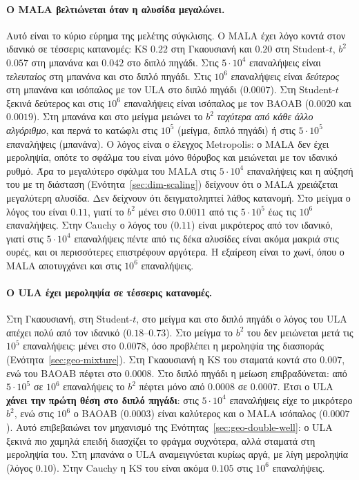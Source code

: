 \paragraph{Ο MALA βελτιώνεται όταν η αλυσίδα μεγαλώνει.}
Αυτό είναι το κύριο εύρημα της μελέτης σύγκλισης. Ο MALA έχει λόγο κοντά στον ιδανικό σε
τέσσερις κατανομές: KS $0.22$ στη Γκαουσιανή και $0.20$ στη Student-$t$, $b^2$ $0.057$
στη μπανάνα και $0.042$ στο διπλό πηγάδι. Στις $5 \cdot 10^4$ επαναλήψεις είναι
\emph{τελευταίος} στη μπανάνα και στο διπλό πηγάδι. Στις $10^6$ επαναλήψεις είναι
\emph{δεύτερος} στη μπανάνα και ισόπαλος με τον ULA στο διπλό πηγάδι ($0.0007$). Στη
Student-$t$ ξεκινά δεύτερος και στις $10^6$ επαναλήψεις είναι ισόπαλος με τον BAOAB
($0.0020$ και $0.0019$). Στη μπανάνα και στο μείγμα μειώνει το $b^2$ \emph{ταχύτερα από
κάθε άλλο αλγόριθμο}, και περνά το κατώφλι στις $10^5$ (μείγμα, διπλό πηγάδι) ή στις
$5 \cdot 10^5$ επαναλήψεις (μπανάνα). Ο λόγος είναι ο έλεγχος Metropolis: ο MALA δεν
έχει μεροληψία, οπότε το σφάλμα του είναι μόνο θόρυβος και μειώνεται με τον ιδανικό
ρυθμό. Άρα το μεγαλύτερο σφάλμα του MALA στις $5 \cdot 10^4$ επαναλήψεις και η αύξησή
του με τη διάσταση (Ενότητα~\ref{sec:dim-scaling}) δείχνουν ότι ο MALA χρειάζεται
μεγαλύτερη αλυσίδα. Δεν δείχνουν ότι δειγματοληπτεί λάθος κατανομή. Στο μείγμα ο λόγος του
είναι $0.11$, γιατί το $b^2$ μένει στο $0.0011$ από τις $5 \cdot 10^5$ έως τις $10^6$
επαναλήψεις. Στην Cauchy ο λόγος του ($0.11$) είναι μικρότερος από τον ιδανικό, γιατί
στις $5 \cdot 10^4$ επαναλήψεις πέντε από τις δέκα αλυσίδες είναι ακόμα μακριά στις
ουρές, και οι περισσότερες επιστρέφουν αργότερα. Η εξαίρεση είναι το χωνί, όπου ο MALA αποτυγχάνει και
στις $10^6$ επαναλήψεις.

\paragraph{Ο ULA έχει μεροληψία σε τέσσερις κατανομές.}
Στη Γκαουσιανή, στη Student-$t$, στο μείγμα και στο διπλό πηγάδι ο λόγος του ULA
απέχει πολύ από τον ιδανικό ($0.18$--$0.73$). Στο μείγμα το $b^2$ του δεν μειώνεται
μετά τις $10^5$ επαναλήψεις: μένει στο $0.0078$, όσο προβλέπει η μεροληψία της
διασποράς (Ενότητα~\ref{sec:geo-mixture}). Στη Γκαουσιανή η KS του σταματά κοντά στο
$0.007$, ενώ του BAOAB πέφτει στο $0.0008$. Στο διπλό πηγάδι η μείωση επιβραδύνεται:
από $5 \cdot 10^5$ σε $10^6$ επαναλήψεις το $b^2$ πέφτει μόνο από $0.0008$ σε
$0.0007$. Έτσι ο ULA \textbf{χάνει την πρώτη θέση στο διπλό πηγάδι}: στις
$5 \cdot 10^4$ επαναλήψεις είχε το μικρότερο $b^2$, ενώ στις $10^6$ ο BAOAB
($0.0003$) είναι καλύτερος και ο MALA ισόπαλος ($0.0007$). Αυτό επιβεβαιώνει τον
μηχανισμό της Ενότητας~\ref{sec:geo-double-well}: ο ULA ξεκινά πιο χαμηλά επειδή
διασχίζει το φράγμα συχνότερα, αλλά σταματά στη μεροληψία του. Στη μπανάνα ο ULA
αναμειγνύεται κυρίως αργά, με λίγη μεροληψία (λόγος $0.10$). Στην Cauchy η KS του
είναι ακόμα $0.105$ στις $10^6$ επαναλήψεις.

